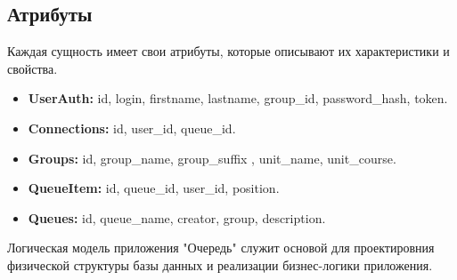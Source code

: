 \subsection{Атрибуты}

Каждая сущность имеет свои атрибуты,
которые описывают их характеристики и свойства.

\begin{itemize}
    \item \textbf{UserAuth:} id, login, firstname, lastname, group\_id,
		password\_hash, token.
    \item \textbf{Connections:} id, user\_id, queue\_id.
    \item \textbf{Groups:} id, group\_name, group\_suffix
		, unit\_name, unit\_course.
    \item \textbf{QueueItem:} id, queue\_id, user\_id, position.
    \item \textbf{Queues:} id, queue\_name, creator, group, description.
\end{itemize}

Логическая модель приложения "Очередь" служит основой для проектировния
физической структуры базы данных и реализации бизнес-логики приложения.

